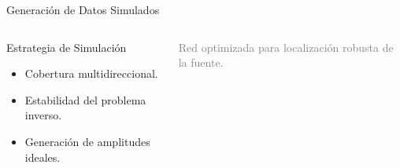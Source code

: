 \begin{frame}{Generación de Datos Simulados}
\begin{columns}[c]
        \vspace{0.4cm}

        \begin{block}{Estrategia de Simulación}
            \scriptsize
            \begin{itemize}
                \item Cobertura multidireccional.
                \item Estabilidad del problema inverso.
                \item Generación de amplitudes ideales.
            \end{itemize}
        \end{block}

        \vspace{0.6cm}
        
        \begin{center}
            \tiny \textcolor{gray}{Red optimizada para localización robusta de la fuente.}
        \end{center}

    \end{columns}

\end{frame}
